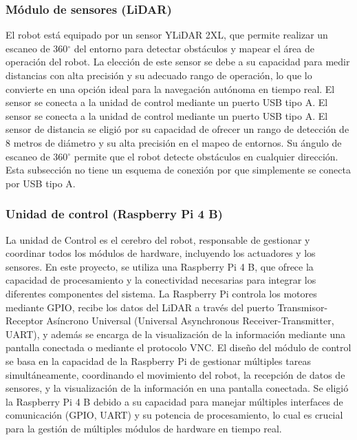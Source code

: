     \subsubsection{M\'odulo de sensores (LiDAR)} %
    \label{ssub:modsen}
    El robot est\'a equipado por un sensor YLiDAR 2XL, que permite realizar un escaneo de
        360$^{\circ}$  del entorno para detectar obst\'aculos y mapear el \'area de operaci\'on del robot. La
        elecci\'on de este sensor se debe a su capacidad para medir distancias con alta
        precisi\'on y su adecuado rango de operaci\'on, lo que lo convierte en una opci\'on ideal
        para la navegaci\'on aut\'onoma en tiempo real.
        El sensor se conecta a la unidad de control mediante un puerto USB tipo A.
    \vskip 0.5cm
    El sensor se conecta a la unidad de control mediante un puerto USB tipo A.
    \vskip 0.5cm
    El sensor de distancia se eligi\'o por su capacidad de ofrecer un rango de detecci\'on de
        8 metros de di\'ametro y su alta precisi\'on en el mapeo de entornos. Su \'angulo de
        escaneo de 360$^{\circ}$   permite que el robot detecte obst\'aculos en cualquier direcci\'on.
    \vskip 0.5cm
    Esta subsecci\'on no tiene un esquema de conexi\'on por que simplemente se conecta
        por USB tipo A.
    \vskip 0.5cm
    \subsubsection{Unidad de control (Raspberry Pi 4 B)} %
    \label{ssub:modcon}
    La unidad de Control es el cerebro del robot, responsable de gestionar y coordinar
        todos los m\'odulos de hardware, incluyendo los actuadores y los sensores. En este
        proyecto, se utiliza una Raspberry Pi 4 B, que ofrece la capacidad de procesamiento y
        la conectividad necesarias para integrar los diferentes componentes del sistema.
    \vskip 0.5cm
    La Raspberry Pi controla los motores mediante GPIO, recibe los datos del LiDAR a
        trav\'es del puerto Transmisor-Receptor As\'incrono Universal (Universal Asynchronous Receiver-Transmitter, UART), y adem\'as se encarga de la visualizaci\'on de la informaci\'on
        mediante una pantalla conectada o mediante el protocolo VNC.
    \vskip 0.5cm
    El dise\~no del m\'odulo de control se basa en la capacidad de la Raspberry Pi de gestionar
        m\'ultiples tareas simult\'aneamente, coordinando el movimiento del robot, la recepci\'on
        de datos de sensores, y la visualizaci\'on de la informaci\'on en una pantalla conectada.
    \vskip 0.5cm
    Se eligi\'o la Raspberry Pi 4 B debido a su capacidad para manejar m\'ultiples interfaces
        de comunicaci\'on (GPIO, UART) y su potencia de procesamiento, lo cual es crucial para
        la gesti\'on de m\'ultiples m\'odulos de hardware en tiempo real.
    \vskip 0.5cm
